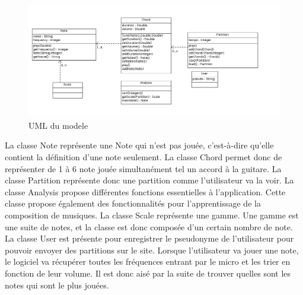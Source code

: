 \begin{figure}[H]
\centering
\includegraphics[scale=0.4]{ModelUML}
\caption{UML du modele}
\end{figure}

La classe Note représente une Note qui n'est pas jouée, c'est-à-dire qu'elle contient la définition d'une note seulement.\newline
La classe Chord permet donc de représenter de 1 à 6 note jouée simultanément tel un accord à la guitare.\newline
La classe Partition représente donc une partition comme l'utilisateur va la voir.\newline
La classe Analysis propose différentes fonctions essentielles à l'application. Cette classe propose également des fonctionnalités pour l'apprentissage de la composition de musiques.\newline
La classe Scale représente une gamme. Une gamme est une suite de notes, et la classe est donc composée d'un certain nombre de note.
La classe User est présente pour enregistrer le pseudonyme de l'utilisateur pour pouvoir envoyer des partitions sur le site.
Lorsque l'utilisateur va jouer une note, le logiciel va récupérer toutes les fréquences entrant par le micro et les trier en fonction de leur volume. Il est donc aisé par la suite de trouver quelles sont les notes qui sont le plus jouées.
